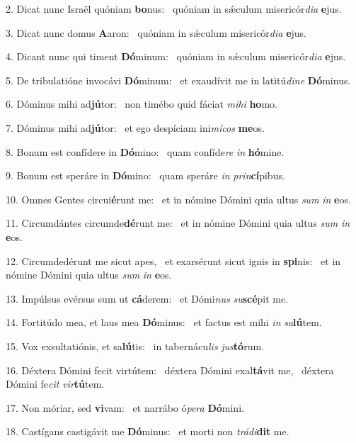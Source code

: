 2. Dicat nunc Israël quóniam \textbf{bo}nus: \ast\  quóniam in sǽculum misericór\textit{di}\textit{a} \textbf{e}jus.\

3. Dicat nunc domus \textbf{A}aron: \ast\  quóniam in sǽculum misericór\textit{di}\textit{a} \textbf{e}jus.\

4. Dicant nunc qui timent \textbf{Dó}minum: \ast\  quóniam in sǽculum misericór\textit{di}\textit{a} \textbf{e}jus.\

5. De tribulatióne invocávi \textbf{Dó}minum: \ast\  et exaudívit me in latitú\textit{di}\textit{ne} \textbf{Dó}minus.\

6. Dóminus mihi ad\textbf{jú}tor: \ast\  non timébo quid fáciat \textit{mi}\textit{hi} \textbf{ho}mo.\

7. Dóminus mihi ad\textbf{jú}tor: \ast\  et ego despíciam ini\textit{mí}\textit{cos} \textbf{me}os.\

8. Bonum est confídere in \textbf{Dó}mino: \ast\  quam confíde\textit{re} \textit{in} \textbf{hó}mine.\

9. Bonum est speráre in \textbf{Dó}mino: \ast\  quam speráre \textit{in} \textit{prin}\textbf{cí}pibus.\

10. Omnes Gentes circui\textbf{é}runt me: \ast\  et in nómine Dómini quia ultus \textit{sum} \textit{in} \textbf{e}os.\

11. Circumdántes circumde\textbf{dé}runt me: \ast\  et in nómine Dómini quia ultus \textit{sum} \textit{in} \textbf{e}os.\

12. Circumdedérunt me sicut apes, \dag\  et exarsérunt sicut ignis in \textbf{spi}nis: \ast\  et in nómine Dómini quia ultus \textit{sum} \textit{in} \textbf{e}os.\

13. Impúlsus evérsus sum ut \textbf{cá}derem: \ast\  et Dómi\textit{nus} \textit{su}\textbf{scé}pit me.\

14. Fortitúdo mea, et laus mea \textbf{Dó}minus: \ast\  et factus est mihi \textit{in} \textit{sa}\textbf{lú}tem.\

15. Vox exsultatiónis, et sa\textbf{lú}tis: \ast\  in tabernácu\textit{lis} \textit{jus}\textbf{tó}rum.\

16. Déxtera Dómini fecit virtútem: \dag\  déxtera Dómini exal\textbf{tá}vit me, \ast\  déxtera Dómini fe\textit{cit} \textit{vir}\textbf{tú}tem.\

17. Non móriar, sed \textbf{vi}vam: \ast\  et narrábo ó\textit{pe}\textit{ra} \textbf{Dó}mini.\

18. Castígans castigávit me \textbf{Dó}minus: \ast\  et morti non \textit{trá}\textit{di}\textbf{dit} me.\

